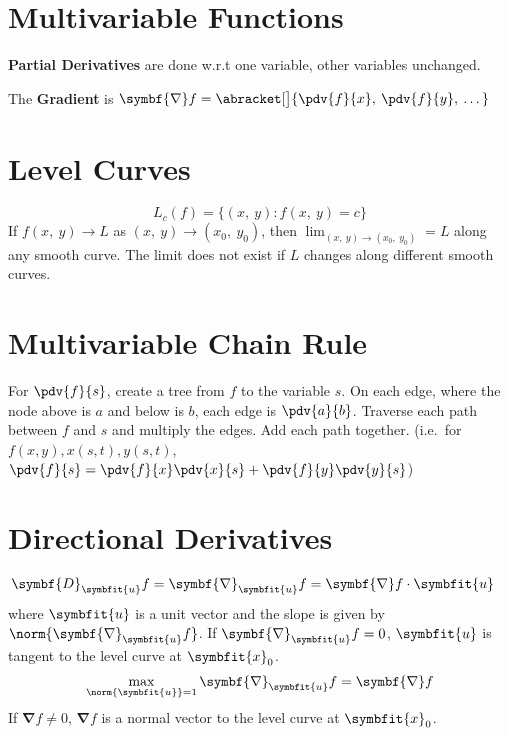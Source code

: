 \documentclass{article}
\begin{document}
\begin{multicols}{3}
    \section*{Multivariable Functions}
    \textbf{Partial Derivatives} are done w.r.t one variable, other variables unchanged.

    The \textbf{Gradient} is \(\symbf{\nabla}f = \abracket[\big]{\pdv{f}{x},\: \pdv{f}{y},\: \dots}\)
    \section*{Level Curves}
    \begin{equation*}
        L_c\left( f \right) = \bigl\{ \left( x,\: y \right) : f\left(x,\: y\right) = c\bigr\}
    \end{equation*}
    If \(f(x,\: y) \to L\) as \((x,\: y) \to (x_0,\: y_0)\), then
    \(\displaystyle \lim_{(x,\: y) \to (x_0,\: y_0)} = L\) along any smooth
    curve. The limit does not exist if \(L\) changes along different smooth curves.

    \section*{Multivariable Chain Rule}
    For \(\pdv{f}{s}\), create a tree from \(f\) to the variable \(s\).
    On each edge, where the node above is \(a\) and below is \(b\), each edge is \(\pdv{a}{b}\).
    Traverse each path between \(f\) and \(s\) and multiply the edges.
    Add each path together.
    (i.e.\ for \(f(x, y), x(s,t), y(s,t)\), \(\pdv{f}{s} = \pdv{f}{x}\pdv{x}{s}+\pdv{f}{y}\pdv{y}{s}\))
    \section*{Directional Derivatives}
    \begin{align*}
        \symbf{D}_{\symbfit{u}}f = \symbf{\nabla}_{\symbfit{u}}f
         & = \symbf{\nabla}f \cdot \symbfit{u}
    \end{align*}
    where \(\symbfit{u}\) is a unit vector and the slope is given by \(\norm{\symbf{\nabla}_{\symbfit{u}}f}\).
    If \(\symbf{\nabla}_{\symbfit{u}}f=0\), \(\symbfit{u}\) is tangent to the level curve at \(\symbfit{x}_0\).
    \begin{align*}
        \max_{\norm{\symbfit{u}} = 1} \symbf{\nabla}_{\symbfit{u}}f = \symbf{\nabla}f
    \end{align*}
    If \(\symbf{\nabla}f\neq 0\), \(\symbf{\nabla}f\) is a normal vector to the level curve at \(\symbfit{x}_0\).

\end{multicols}
\end{document}
